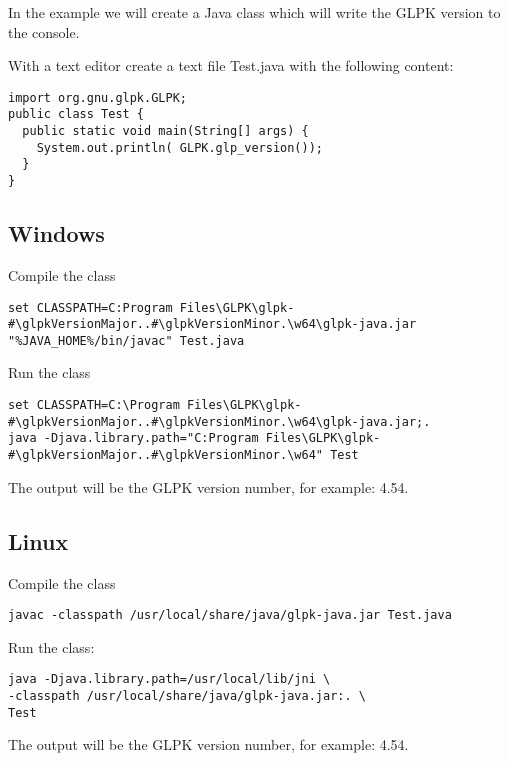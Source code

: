 \documentclass[a4paper,11pt]{report}
\newcommand{\glpkVersionMajor}{4}
\newcommand{\glpkVersionMinor}{54}
\begin{document}
In the example we will create a Java class which will write the GLPK version to the console.

With a text editor create a text file Test.java with the following content:

\begin{lstlisting}
import org.gnu.glpk.GLPK;
public class Test {
  public static void main(String[] args) {
    System.out.println( GLPK.glp_version());
  }
}
\end{lstlisting}

\subsection{Windows}

Compile the class

\begin{lstlisting}
set CLASSPATH=C:Program Files\GLPK\glpk-#\glpkVersionMajor..#\glpkVersionMinor.\w64\glpk-java.jar
"%JAVA_HOME%/bin/javac" Test.java
\end{lstlisting}

Run the class

\begin{lstlisting}
set CLASSPATH=C:\Program Files\GLPK\glpk-#\glpkVersionMajor..#\glpkVersionMinor.\w64\glpk-java.jar;.
java -Djava.library.path="C:Program Files\GLPK\glpk-#\glpkVersionMajor..#\glpkVersionMinor.\w64" Test
\end{lstlisting}

The output will be the GLPK version number, for example: \glpkVersionMajor.\glpkVersionMinor.

\subsection{Linux}
Compile the class

\begin{lstlisting}
javac -classpath /usr/local/share/java/glpk-java.jar Test.java
\end{lstlisting}

Run the class:

\begin{lstlisting}
java -Djava.library.path=/usr/local/lib/jni \
-classpath /usr/local/share/java/glpk-java.jar:. \
Test
\end{lstlisting}

The output will be the GLPK version number, for example: \glpkVersionMajor.\glpkVersionMinor.
\end{document}
